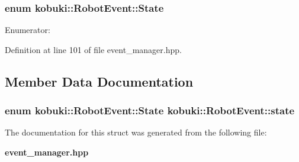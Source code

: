 \subsubsection[{\-State}]{\setlength{\rightskip}{0pt plus 5cm}enum {\bf kobuki\-::\-Robot\-Event\-::\-State}}\label{structkobuki_1_1RobotEvent_aa2da423ca872390312344a020400ec06}
\begin{Desc}
\item[\-Enumerator\-: ]\par
\begin{description}
\item[{\em 
\-Offline\label{structkobuki_1_1RobotEvent_aa2da423ca872390312344a020400ec06a2d7440133b8c35765d5775aa7b533cf4}
}]\item[{\em 
\-Online\label{structkobuki_1_1RobotEvent_aa2da423ca872390312344a020400ec06a5a4f31c47a458725cd579a8096863318}
}]\item[{\em 
\-Unknown\label{structkobuki_1_1RobotEvent_aa2da423ca872390312344a020400ec06a106f74dcd5800d5ea7f5113505aa63bc}
}]\end{description}
\end{Desc}



\-Definition at line 101 of file event\-\_\-manager.\-hpp.



\subsection{\-Member \-Data \-Documentation}
\subsubsection[{state}]{\setlength{\rightskip}{0pt plus 5cm}enum {\bf kobuki\-::\-Robot\-Event\-::\-State}  {\bf kobuki\-::\-Robot\-Event\-::state}}\label{structkobuki_1_1RobotEvent_ac9f74ad86313b2ecf97ea3fa17c1a474}


\-The documentation for this struct was generated from the following file\-:\begin{DoxyCompactItemize}
\item 
{\bf event\-\_\-manager.\-hpp}\end{DoxyCompactItemize}
